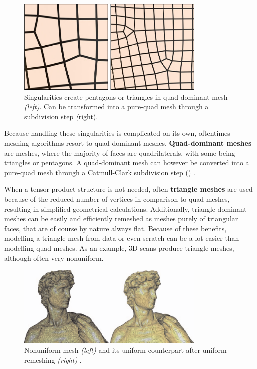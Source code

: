 \documentclass{ACGSeminar}
\begin{document}
\begin{figure}[htb!]
	\begin{centering}
		\includegraphics[width=9cm]{img/Singularities.png}\par
	\end{centering}
	\caption{Singularities create pentagons or triangles in quad-dominant mesh \textit{(left)}. Can be transformed into a pure-quad mesh through a subdivision step \textit(right). \cite{jakob2015instant}}
	\label{fig:singularities}
\end{figure}

Because handling these singularities is complicated on its own, oftentimes meshing algorithms resort to quad-dominant meshes. \textbf{Quad-dominant meshes} are meshes, where the majority of faces are quadrilaterals, with some being triangles or pentagons. A quad-dominant mesh can however be converted into a pure-quad mesh through a Catmull-Clark subdivision step (\cite{catmull1978recursively}) \cite{jakob2015instant}.\bigskip

When a tensor product structure is not needed, often \textbf{triangle meshes} are used because of the reduced number of vertices in comparison to quad meshes, resulting in simplified geometrical calculations. Additionally, triangle-dominant meshes can be easily and efficiently remeshed as meshes purely of triangular faces, that are of course by nature always flat. Because of these benefits, modelling a triangle mesh from data or even scratch can be a lot easier than modelling quad meshes. As an example, 3D scans produce triangle meshes, although often very nonuniform.\bigskip

\begin{figure}[htb!]
	\begin{centering}
		\includegraphics[width=9cm]{img/Uniform-Mesh.png}\par
	\end{centering}
	\caption{Nonuniform mesh \textit{(left)} and its uniform counterpart after uniform remeshing \textit{(right)} \cite{alliez2008recent}.}
	\label{fig:uniform-mesh}
\end{figure}
\end{document}
